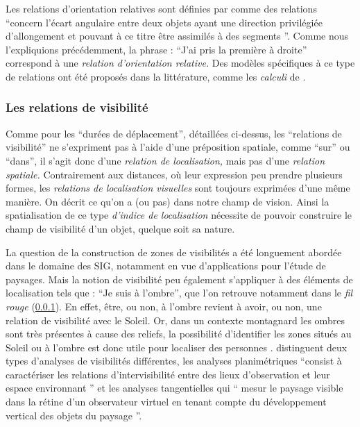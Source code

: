
Les relations d'orientation relatives sont définies par
\textcite{Duchene2019} comme des relations
\enquote{concern l'écart angulaire entre deux objets
  ayant une direction privilégiée d'allongement et pouvant à ce titre
  être assimilés à des segments \textelp{}}. Comme nous l'expliquions
précédemment, la phrase : \enquote{J'ai pris la première à droite}
correspond à une \emph{relation d'orientation relative.} Des modèles
spécifiques à ce type de relations ont été proposés dans la
littérature, comme les \emph{calculi} de
\textcite{Schlider1995,Isli2000}.

\subsubsection{Les relations de visibilité}

Comme pour les \enquote{durées de déplacement}, détaillées ci-dessus,
les \enquote{relations de visibilité} ne s'expriment pas à l'aide
d'une préposition spatiale, comme \enquote{sur} ou \enquote{dans}, il
s'agit donc d'une \emph{relation de localisation,} mais pas d'une
\emph{relation spatiale.} Contrairement aux distances, où leur
expression peu prendre plusieurs formes, les \emph{relations de
  localisation visuelles} sont toujours exprimées d'une même
manière. On décrit ce qu'on a (ou pas) dans notre champ de
vision. Ainsi la spatialisation de ce type \emph{d'indice de
  localisation} nécessite de pouvoir construire le champ de visibilité
d'un objet, quelque soit sa nature.

La question de la construction de zones de visibilités a été
longuement abordée dans le domaine des SIG, notamment en vue
d’applications pour l'étude de paysages. Mais la notion de visibilité
peu également s'appliquer à des éléments de localisation tels que :
\enquote{Je suis à l'ombre}, que l'on retrouve notamment dans le
\emph{fil rouge} (\ref{}). En effet, être, ou non, à l'ombre revient à
avoir, ou non, une relation de visibilité avec le Soleil. Or, dans un
contexte montagnard les ombres sont très présentes à cause des
reliefs, la possibilité d'identifier les zones situés au Soleil ou à
l'ombre est donc utile pour localiser des personnes
\autocite{Houpert2003}. \textcite{Sahraoui2016} distinguent deux types
d'analyses de visibilités différentes, les analyses planimétriques
\enquote{consist à caractériser les relations
  d’intervisibilité entre des lieux d’observation et leur espace
  environnant \textelp{}} et les analyses tangentielles qui
\enquote{\textelp{} mesur le paysage visible dans la
  rétine d’un observateur virtuel en tenant compte du développement
  vertical des objets du paysage \textelp{}}.

